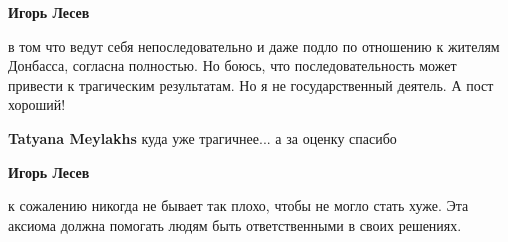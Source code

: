 \begin{itemize}
\begin{itemize}
\textbf{Игорь Лесев} 

в том что ведут себя непоследовательно и даже подло по отношению к жителям
Донбасса, согласна полностью. Но боюсь, что последовательность может привести к
трагическим результатам. Но я не государственный деятель. А пост хороший!


\textbf{Tatyana Meylakhs} куда уже трагичнее... а за оценку спасибо

\textbf{Игорь Лесев} 

к сожалению никогда не бывает так плохо, чтобы не могло стать хуже. Эта аксиома
должна помогать людям быть ответственными в своих решениях.

\end{itemize} %

\end{itemize} %

